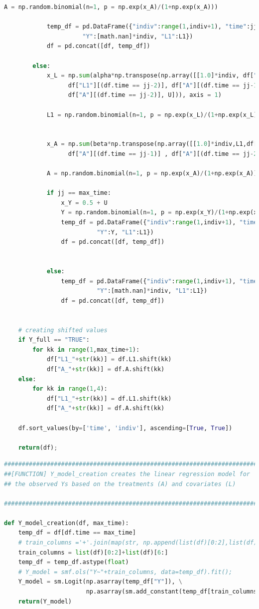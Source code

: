 \begin{lstlisting}[language=Python]
            A = np.random.binomial(n=1, p = np.exp(x_A)/(1+np.exp(x_A)))

            temp_df = pd.DataFrame({"indiv":range(1,indiv+1), "time":jj, "U":U, "A":A,\
                      "Y":[math.nan]*indiv, "L1":L1})
            df = pd.concat([df, temp_df])

        else: 
            x_L = np.sum(alpha*np.transpose(np.array([[1.0]*indiv, df["L1"][(df.time == jj-1)], \
                  df["L1"][(df.time == jj-2)], df["A"][(df.time == jj-1)], \
                  df["A"][(df.time == jj-2)], U])), axis = 1)

            L1 = np.random.binomial(n=1, p = np.exp(x_L)/(1+np.exp(x_L)))


            x_A = np.sum(beta*np.transpose(np.array([[1.0]*indiv,L1,df["L1"][(df.time == jj-1)],\
                  df["A"][(df.time == jj-1)] , df["A"][(df.time == jj-2)]])), axis = 1)

            A = np.random.binomial(n=1, p = np.exp(x_A)/(1+np.exp(x_A)))

            if jj == max_time: 
                x_Y = 0.5 + U 
                Y = np.random.binomial(n=1, p = np.exp(x_Y)/(1+np.exp(x_Y)))                
                temp_df = pd.DataFrame({"indiv":range(1,indiv+1), "time":jj,"U":U, "A":A, \
                          "Y":Y, "L1":L1})
                df = pd.concat([df, temp_df])


            else: 
                temp_df = pd.DataFrame({"indiv":range(1,indiv+1), "time":jj,"U":U, "A":A, \
                          "Y":[math.nan]*indiv, "L1":L1})
                df = pd.concat([df, temp_df])


    # creating shifted values 
    if Y_full == "TRUE":
        for kk in range(1,max_time+1):
            df["L1_"+str(kk)] = df.L1.shift(kk)
            df["A_"+str(kk)] = df.A.shift(kk)
    else:
        for kk in range(1,4):
            df["L1_"+str(kk)] = df.L1.shift(kk)
            df["A_"+str(kk)] = df.A.shift(kk)
            
    df.sort_values(by=['time', 'indiv'], ascending=[True, True])

    return(df); 
\end{lstlisting}

\begin{lstlisting}[language=Python]
#########################################################################
##[FUNCTION] Y_model_creation creates the linear regression model for 
## the observed Ys based on the treatments (A) and covariates (L)  

#########################################################################

def Y_model_creation(df, max_time): 
    temp_df = df[df.time == max_time]
    # train_columns ='+'.join(map(str, np.append(list(df)[0:2],list(df)[6:])))
    train_columns = list(df)[0:2]+list(df)[6:]
    temp_df = temp_df.astype(float)
    # Y_model = smf.ols("Y~"+train_columns, data=temp_df).fit(); 
    Y_model = sm.Logit(np.asarray(temp_df["Y"]), \
                       np.asarray(sm.add_constant(temp_df[train_columns]))).fit(); 
    return(Y_model)
\end{lstlisting}

